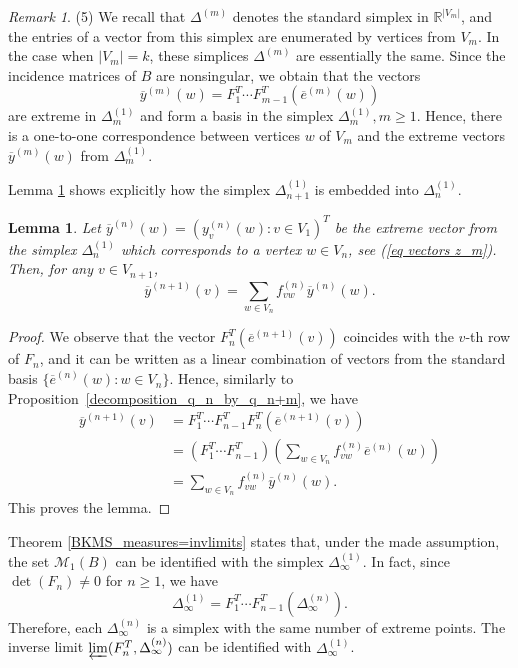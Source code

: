 \documentclass[11pt, english, reqno]{amsart}
\theoremstyle{definition}
\theoremstyle{remark}
\newtheorem{remark}[defin]{Remark}
\theoremstyle{plain}
\newtheorem{lemma}[defin]{Lemma}
\def\ov{\overline}
\numberwithin{equation}{section}
\begin{document}
\begin{remark}
(5)  We recall that $\Delta^{(m)}$ denotes the standard simplex in
$\mathbb R^{|V_m|}$, and the entries of a  vector from this
simplex are enumerated by vertices from $V_m$. In the case
when $|V_m| = k $, these simplices $\Delta^{(m)}$ are essentially
the same.
Since the incidence matrices of
$B$ are nonsingular, we obtain that the vectors
\begin{equation}\label{eq vectors z_m}
\ov y^{(m)}(w)  =   F_1^T  \cdots
 F_{m-1}^T(\ov e^{(m)}(w))
\end{equation}
are extreme in $\Delta^{(1)}_{m}$ and form a basis in the simplex
$\Delta^{(1)}_{m}, m \geq 1$. Hence, there is a
one-to-one correspondence between vertices $w$ of $V_m$ and the
 extreme vectors $\ov y^{(m)}(w)$ from $\Delta^{(1)}_{m}$.
\end{remark}

Lemma \ref{lem (n+1)-th simplex in n-th} shows explicitly how the
 simplex $\Delta^{(1)}_{n+1}$ is embedded into $\Delta^{(1)}_{n}$.
 
 
\begin{lemma}\label{lem (n+1)-th simplex in n-th}
Let $\ov y^{(n)}(w) = (y_v^{(n)}(w) : v \in V_1)^T$
 be the extreme vector from the simplex  $\Delta^{(1)}_{n}$ which
  corresponds  to a vertex $w \in V_n$, see (\ref{eq vectors z_m}).
   Then, for any $v\in V_{n+1}$,
\begin{equation}\label{1.2a}
\ov y^{(n+1)}(v) = \sum_{w \in V_n}f_{vw}^{(n)} \ov y^{(n)}(w).
\end{equation}
\end{lemma}

\begin{proof}
We observe that the vector $F_n^T (\ov e^{(n+1)}(v))$ coincides
 with the $v$-th row of $F_n$, and it can be written as a linear
  combination of vectors from the standard basis $\{\ov e^{(n)}(w) :
   w \in V_n\}$. Hence, similarly to
   Proposition~\ref{decomposition_q_n_by_q_n+m}, we have
\begin{align*}
\ov y^{(n+1)}(v) & = F_1^T  \cdots  F_{n-1}^T
F_n^T (\ov e^{(n+1)}(v))\\
& = (F_1^T \cdots  F_{n-1}^T)
\left(\sum_{w \in V_n} f^{(n)}_{vw}\ov e^{(n)}(w)\right)\\
 &= \sum_{w \in V_n} f^{(n)}_{vw} \ov y^{(n)}(w).
\end{align*}
This proves the lemma.
\end{proof}

Theorem \ref{BKMS_measures=invlimits} states that, under the made
 assumption, the set $\mathcal{M}_1(B)$ can be identified with the
 simplex $\Delta_{\infty}^{(1)}$.
In fact, since $\det(F_n) \neq 0$ for $n\geq 1$, we have
$$
\Delta_{\infty}^{(1)} = F_1^T \cdots F_{n-1}^T (\Delta_{\infty}^{(n)}).
$$
Therefore, each $\Delta_{\infty}^{(n)}$ is a simplex with the same
number of extreme points. The inverse
limit $\varprojlim(F_n^T,\Delta_{\infty}^{(n)})$ can be identified with
$\Delta_{\infty}^{(1)}$.
\end{document}
